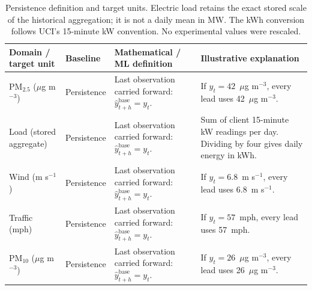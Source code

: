 \begin{table}[t]
\centering
\scriptsize
\setlength{\tabcolsep}{4pt}
\renewcommand{\arraystretch}{1.15}
\begin{tabularx}{\linewidth}{@{}l l >{\raggedright\arraybackslash}X >{\raggedright\arraybackslash}X@{}}
\toprule
Domain / target unit & Baseline & Mathematical / ML definition & Illustrative explanation \\
\midrule
PM$_{2.5}$ ($\mu$g m$^{-3}$) & Persistence &
  Last observation carried forward: $\hat{y}^{\mathrm{base}}_{t+h} = y_t$. &
  If $y_t = 42$~$\mu$g m$^{-3}$, every lead uses 42~$\mu$g m$^{-3}$. \\
Load (stored aggregate) & Persistence &
  Last observation carried forward: $\hat{y}^{\mathrm{base}}_{t+h} = y_t$. &
  Sum of client 15-minute kW readings per day. Dividing by four gives daily energy in kWh. \\
Wind (m s$^{-1}$) & Persistence &
  Last observation carried forward: $\hat{y}^{\mathrm{base}}_{t+h} = y_t$. &
  If $y_t = 6.8$~m s$^{-1}$, every lead uses 6.8~m s$^{-1}$. \\
Traffic (mph) & Persistence &
  Last observation carried forward: $\hat{y}^{\mathrm{base}}_{t+h} = y_t$. &
  If $y_t = 57$~mph, every lead uses 57~mph. \\
PM$_{10}$ ($\mu$g m$^{-3}$) & Persistence &
  Last observation carried forward: $\hat{y}^{\mathrm{base}}_{t+h} = y_t$. &
  If $y_t = 26$~$\mu$g m$^{-3}$, every lead uses 26~$\mu$g m$^{-3}$. \\
\bottomrule
\end{tabularx}
\caption{Persistence definition and target units. Electric load retains the exact stored scale of the historical aggregation; it is not a daily mean in MW. The kWh conversion follows UCI's 15-minute kW convention. No experimental values were rescaled.}
\label{tab:baselines}
\end{table}
